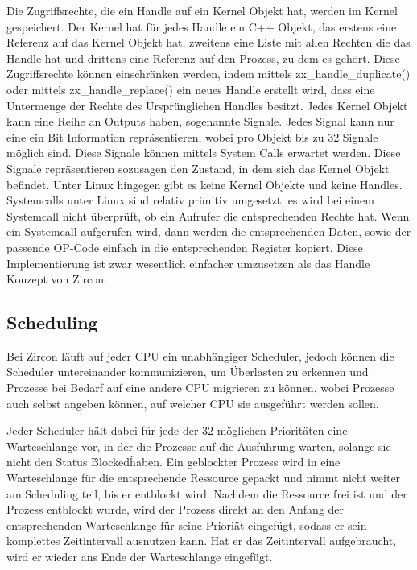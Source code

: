 \documentclass[a4paper]{scrartcl}
\begin{document}
Die Zugriffsrechte, die ein Handle auf ein Kernel Objekt hat, werden im Kernel gespeichert. Der Kernel hat für jedes Handle ein C++ Objekt, das erstens eine Referenz auf das Kernel Objekt hat, zweitens eine Liste mit allen Rechten die das Handle hat und drittens eine Referenz auf den Prozess, zu dem es gehört. Diese Zugriffsrechte können einschränken werden, indem mittels zx\_handle\_duplicate() \cite{Fuchsia.HandleDuplicate} oder mittels zx\_handle\_replace() \cite{Fuchsia.HandleReplace} ein neues Handle erstellt wird, dass eine Untermenge der Rechte des Ursprünglichen Handles besitzt.
Jedes Kernel Objekt kann eine Reihe an Outputs haben, sogenannte Signale. Jedes Signal kann nur eine ein Bit Information repräsentieren, wobei pro Objekt bis zu 32 Signale möglich sind. Diese Signale können mittels System Calls erwartet werden. Diese Signale repräsentieren sozusagen den Zustand, in dem sich das Kernel Objekt befindet.
Unter Linux hingegen gibt es keine Kernel Objekte und keine Handles. Systemcalls unter Linux sind relativ primitiv umgesetzt, es wird bei einem Systemcall nicht überprüft, ob ein Aufrufer die entsprechenden Rechte hat. Wenn ein Systemcall aufgerufen wird, dann werden die entsprechenden Daten, sowie der passende OP-Code einfach in die entsprechenden Register kopiert. Diese Implementierung ist zwar wesentlich einfacher umzusetzen als das Handle Konzept von Zircon.
\subsection{Scheduling}
Bei Zircon läuft auf jeder CPU ein unabhängiger Scheduler, jedoch können die Scheduler untereinander kommunizieren, um Überlasten zu erkennen und Prozesse bei Bedarf auf eine andere CPU migrieren zu können, wobei Prozesse auch selbst angeben können, auf welcher CPU sie ausgeführt werden sollen.

Jeder Scheduler hält dabei für jede der 32 möglichen Prioritäten eine Warteschlange vor, in der die Prozesse auf die Ausführung warten, solange sie nicht den Status \"Blocked\" haben. Ein geblockter Prozess wird in eine Warteschlange für die entsprechende Ressource gepackt und nimmt nicht weiter am Scheduling teil, bis er entblockt wird. Nachdem die Ressource frei ist und der Prozess entblockt wurde, wird der Prozess direkt an den Anfang der entsprechenden Warteschlange für seine Prioriät eingefügt, sodass er sein komplettes Zeitintervall ausnutzen kann. Hat er das Zeitintervall aufgebraucht, wird er wieder ans Ende der Warteschlange eingefügt.\cite{Fuchsia.Zircon.Scheduling}
\end{document}
